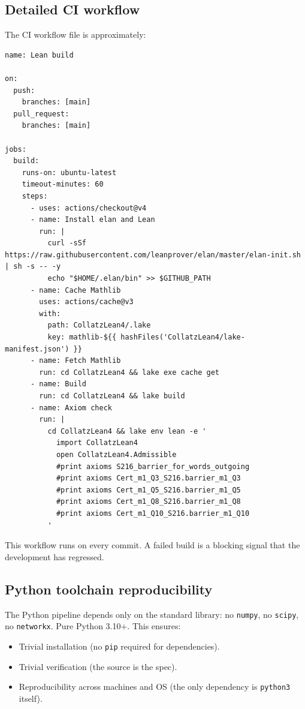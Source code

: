 \documentclass[11pt,a4paper]{article}
\theoremstyle{plain}
\theoremstyle{definition}
\begin{document}
\subsection*{Detailed CI workflow}

The CI workflow file is approximately:

\begin{lstlisting}
name: Lean build

on:
  push:
    branches: [main]
  pull_request:
    branches: [main]

jobs:
  build:
    runs-on: ubuntu-latest
    timeout-minutes: 60
    steps:
      - uses: actions/checkout@v4
      - name: Install elan and Lean
        run: |
          curl -sSf https://raw.githubusercontent.com/leanprover/elan/master/elan-init.sh | sh -s -- -y
          echo "$HOME/.elan/bin" >> $GITHUB_PATH
      - name: Cache Mathlib
        uses: actions/cache@v3
        with:
          path: CollatzLean4/.lake
          key: mathlib-${{ hashFiles('CollatzLean4/lake-manifest.json') }}
      - name: Fetch Mathlib
        run: cd CollatzLean4 && lake exe cache get
      - name: Build
        run: cd CollatzLean4 && lake build
      - name: Axiom check
        run: |
          cd CollatzLean4 && lake env lean -e '
            import CollatzLean4
            open CollatzLean4.Admissible
            #print axioms S216_barrier_for_words_outgoing
            #print axioms Cert_m1_Q3_S216.barrier_m1_Q3
            #print axioms Cert_m1_Q5_S216.barrier_m1_Q5
            #print axioms Cert_m1_Q8_S216.barrier_m1_Q8
            #print axioms Cert_m1_Q10_S216.barrier_m1_Q10
          '
\end{lstlisting}

This workflow runs on every commit. A failed build is a blocking
signal that the development has regressed.

\subsection*{Python toolchain reproducibility}

The Python pipeline depends only on the standard library: no
\texttt{numpy}, no \texttt{scipy}, no \texttt{networkx}. Pure
Python 3.10+. This ensures:
\begin{itemize}
   \item Trivial installation (no \texttt{pip} required for
         dependencies).
   \item Trivial verification (the source is the spec).
   \item Reproducibility across machines and OS (the only
         dependency is \texttt{python3} itself).
\end{itemize}
\end{document}
